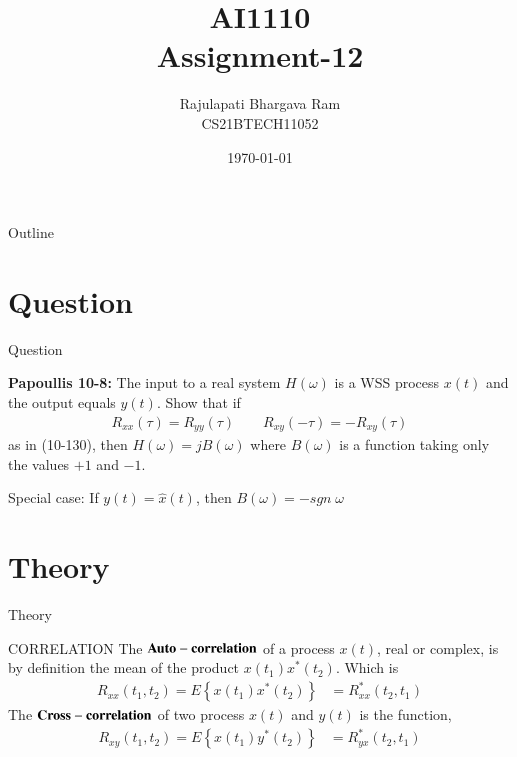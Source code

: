 \documentclass{beamer}
\title{AI1110 \\ Assignment-12}
\author{Rajulapati Bhargava Ram \\ CS21BTECH11052}
\date{\today}
\providecommand{\cbrak}[1]{\ensuremath{\left\{#1\right\}}}
\begin{document}
\begin{frame}
    \titlepage 
\end{frame}
\logo{}


\begin{frame}{Outline}
    \tableofcontents
\end{frame}



\section{Question}
\begin{frame}{Question}
    \begin{block}{\textbf{Papoullis 10-8:} } 
      The input to a real system $H(\omega)$ is a WSS process $x(t)$ and the output equals $y(t)$. Show that if 
      \begin{align*}
         R_{xx}(\tau) = R_{yy}(\tau) \qquad  R_{xy}(-\tau) = -R_{xy}(\tau)
      \end{align*}   
      as in (10-130), then $H(\omega) = jB(\omega)$ where $B(\omega)$ is a function taking only the values $+1$ and $-1$.
      
      Special case: If $y(t) = \widehat{x}(t)$, then $B(\omega) = -sgn \;   \omega$        
     \end{block}
     
\end{frame}


\section{Theory}
\begin{frame}{Theory}
   \begin{block}{CORRELATION}
      The $\bf{Auto-correlation}$ of a process $x(t)$, real or complex, is by
      definition the mean of the product $x(t_1)x^*(t_2)$. Which is
     \begin{align}
       R_{xx}(t_1, t_2)  = E\cbrak{x(t_1)x^*(t_2)}
       				    &= R^*_{xx}(t_2, t_1)
     \end{align}
      The $\bf{Cross-correlation}$ of two process $x(t)$ and $y(t)$ is the function,
      \begin{align}
        R_{xy}(t_1, t_2)  = E\cbrak{x(t_1)y^*(t_2)}
       				    &= R^*_{yx}(t_2, t_1)
      \end{align}
   
  \end{block}   
  
	
\end{frame}
\end{document}
